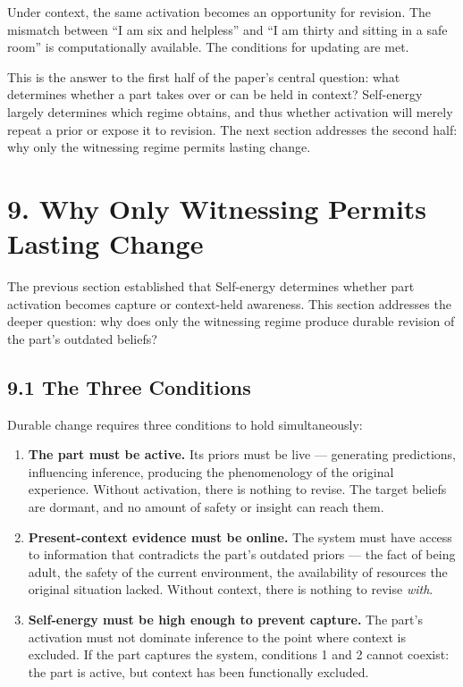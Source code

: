 \documentclass[11pt]{article}
\begin{document}
Under context, the same activation becomes an opportunity for revision.
The mismatch between ``I am six and helpless'' and ``I am thirty and
sitting in a safe room'' is computationally available. The conditions
for updating are met.

This is the answer to the first half of the paper's central question:
what determines whether a part takes over or can be held in context?
Self-energy largely determines which regime obtains, and thus whether
activation will merely repeat a prior or expose it to revision. The next
section addresses the second half: why only the witnessing regime
permits lasting change.

\section{9. Why Only Witnessing Permits Lasting
Change}\label{why-only-witnessing-permits-lasting-change}

The previous section established that Self-energy determines whether
part activation becomes capture or context-held awareness. This section
addresses the deeper question: why does only the witnessing regime
produce durable revision of the part's outdated beliefs?

\subsection{9.1 The Three Conditions}\label{the-three-conditions}

Durable change requires three conditions to hold simultaneously:

\begin{enumerate}
\def\labelenumi{\arabic{enumi}.}
\item
  \textbf{The part must be active.} Its priors must be live ---
  generating predictions, influencing inference, producing the
  phenomenology of the original experience. Without activation, there is
  nothing to revise. The target beliefs are dormant, and no amount of
  safety or insight can reach them.
\item
  \textbf{Present-context evidence must be online.} The system must have
  access to information that contradicts the part's outdated priors ---
  the fact of being adult, the safety of the current environment, the
  availability of resources the original situation lacked. Without
  context, there is nothing to revise \emph{with}.
\item
  \textbf{Self-energy must be high enough to prevent capture.} The
  part's activation must not dominate inference to the point where
  context is excluded. If the part captures the system, conditions 1 and
  2 cannot coexist: the part is active, but context has been
  functionally excluded.
\end{enumerate}
\end{document}
